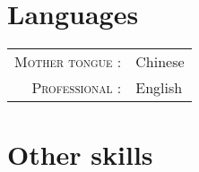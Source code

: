\documentclass[a4paper,10pt]{article}
\begin{document}





\vspace{-10pt}

\section{Languages}

\begin{tabular}{rp{10cm}}

  \textsc{Mother tongue :} & Chinese \\

  \textsc{Professional :} & English \\

\end{tabular}


\section{Other skills}
\end{document}
